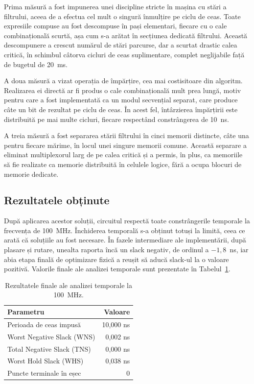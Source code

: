 Prima măsură a fost impunerea unei discipline stricte în mașina cu stări a filtrului,
aceea de a efectua cel mult o singură înmulțire pe ciclu de ceas. Toate expresiile
compuse au fost descompuse în pași elementari, fiecare cu o cale combinațională
scurtă, așa cum s-a arătat în secțiunea dedicată filtrului. Această descompunere a
crescut numărul de stări parcurse, dar a scurtat drastic calea critică, în schimbul
câtorva cicluri de ceas suplimentare, complet neglijabile față de bugetul de 20~ms.

A doua măsură a vizat operația de împărțire, cea mai costisitoare din algoritm.
Realizarea ei directă ar fi produs o cale combinațională mult prea lungă, motiv pentru
care a fost implementată ca un modul secvențial separat, care produce câte un bit de
rezultat pe ciclu de ceas. În acest fel, întârzierea împărțirii este distribuită pe
mai multe cicluri, fiecare respectând constrângerea de 10~ns.

A treia măsură a fost separarea stării filtrului în cinci memorii distincte, câte una
pentru fiecare mărime, în locul unei singure memorii comune. Această separare a
eliminat multiplexorul larg de pe calea critică și a permis, în plus, ca memoriile să
fie realizate ca memorie distribuită în celulele logice, fără a ocupa blocuri de
memorie dedicate.

\subsection{Rezultatele obținute}

După aplicarea acestor soluții, circuitul respectă toate constrângerile temporale la
frecvența de 100~MHz. Închiderea temporală s-a obținut totuși la limită, ceea ce arată
că soluțiile au fost necesare. În fazele intermediare ale implementării, după plasare
și rutare, unealta raporta încă un slack negativ, de ordinul a $-1{,}8$~ns, iar abia
etapa finală de optimizare fizică a reușit să aducă slack-ul la o valoare pozitivă.
Valorile finale ale analizei temporale sunt prezentate în Tabelul~\ref{tab:timing}.

\begin{table}[H]
\centering
\caption{Rezultatele finale ale analizei temporale la 100~MHz.}
\label{tab:timing}
\begin{tabular}{l r}
\toprule
\textbf{Parametru} & \textbf{Valoare} \\
\midrule
Perioada de ceas impusă & 10,000 ns \\
Worst Negative Slack (WNS) & 0,002 ns \\
Total Negative Slack (TNS) & 0,000 ns \\
Worst Hold Slack (WHS) & 0,038 ns \\
Puncte terminale în eșec & 0 \\
\bottomrule
\end{tabular}
\end{table}

